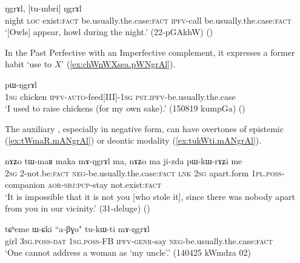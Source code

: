 \begin{exe}
\ex \label{ex:tu.NgrAl}
  ŋgrɤl, [tu-mbri] ŋgrɤl \\
night \textsc{loc} exist:\textsc{fact} be.usually.the.case:\textsc{fact} \textsc{ipfv}-call be.usually.the.case:\textsc{fact} \\
\glt `[Owls] appear, howl during the night.' (22-pGAkhW)
()
\end{exe}

In the Past Perfective with an Imperfective complement, it expresses a former habit `use to $X$'  (\ref{ex:chWnWXsea.pWNgrAl}).

\begin{exe}
\ex \label{ex:chWnWXsea.pWNgrAl}
  pɯ-ŋgrɤl  \\
\textsc{1sg}  chicken \textsc{ipfv}-\textsc{auto}-feed[III]-\textsc{1sg} \textsc{pst}.\textsc{ipfv}-be.usually.the.case \\
\glt `I used to raise chickens (for my own sake).' (150819 kumpGa)
()
\end{exe}

The auxiliary , especially in negative form, can have overtones of epistemic (\ref{ex:tWmaR.mANgrAl}) or deontic modality (\ref{ex:tukWti.mANgrAl}).

\begin{exe}
\ex \label{ex:tWmaR.mANgrAl}
 \gll nɤʑo tɯ-maʁ maka mɤ-ŋgrɤl ma, nɤʑo ma ji-zda pɯ-kɯ-rɤʑi me \\
 \textsc{2sg} 2-not.be:\textsc{fact} \textsc{neg}-be.usually.the.case:\textsc{fact} \textsc{lnk} \textsc{2sg} apart.form \textsc{1pl}.\textsc{poss}-companion \textsc{aor}-\textsc{sbj}:\textsc{pcp}-stay not.exist:\textsc{fact} \\
\glt `It is impossible that it is not you [who stole it], since there was nobody apart from you in our vicinity.' (31-deluge)
()
\end{exe}

\begin{exe}
\ex \label{ex:tukWti.mANgrAl}
 \gll tɕʰeme ɯ-ɕki ``a-βɣo" tu-kɯ-ti mɤ-ŋgrɤl \\
 girl \textsc{3sg}.\textsc{poss}-\textsc{dat} \textsc{1sg}.\textsc{poss}-FB \textsc{ipfv}-\textsc{genr}-say \textsc{neg}-be.usually.the.case:\textsc{fact} \\
\glt `One cannot address a woman as `my uncle'.' (140425 kWmdza 02)
\end{exe} 

